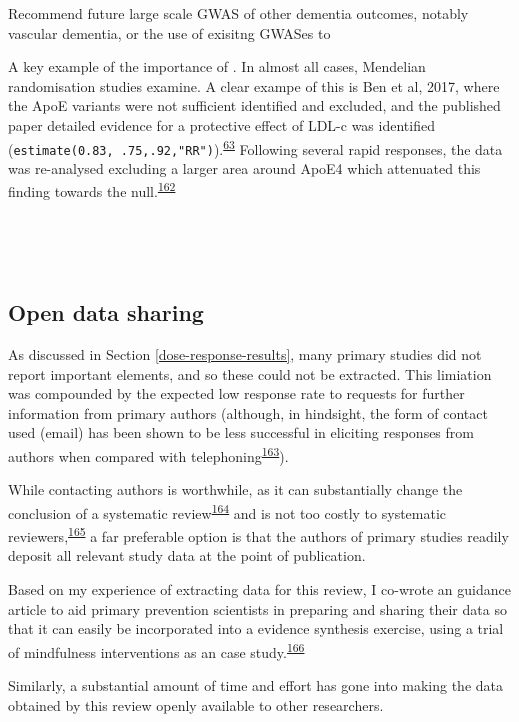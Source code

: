 \documentclass[a4paper, twoside]{templates/ociamthesis}
\begin{document}
Recommend future large scale GWAS of other dementia outcomes, notably vascular dementia, or the use of exisitng GWASes to

A key example of the importance of . In almost all cases, Mendelian randomisation studies examine. A clear exampe of this is Ben et al, 2017, where the ApoE variants were not sufficient identified and excluded, and the published paper detailed evidence for a protective effect of LDL-c was identified (\texttt{estimate(0.83,\ .75,.92,"RR")}).\textsuperscript{\protect\hyperlink{ref-benn2017}{63}} Following several rapid responses, the data was re-analysed excluding a larger area around ApoE4 which attenuated this finding towards the null.\textsuperscript{\protect\hyperlink{ref-benn2017a}{162}}

~

~

\hypertarget{sys-rev-open-data}{%
\subsection{Open data sharing}\label{sys-rev-open-data}}

As discussed in Section \ref{dose-response-results}, many primary studies did not report important elements, and so these could not be extracted. This limiation was compounded by the expected low response rate to requests for further information from primary authors (although, in hindsight, the form of contact used (email) has been shown to be less successful in eliciting responses from authors when compared with telephoning\textsuperscript{\protect\hyperlink{ref-danko2019}{163}}).

While contacting authors is worthwhile, as it can substantially change the conclusion of a systematic review\textsuperscript{\protect\hyperlink{ref-meursingereynders2019}{164}} and is not too costly to systematic reviewers,\textsuperscript{\protect\hyperlink{ref-cooper2019}{165}} a far preferable option is that the authors of primary studies readily deposit all relevant study data at the point of publication.

Based on my experience of extracting data for this review, I co-wrote an guidance article to aid primary prevention scientists in preparing and sharing their data so that it can easily be incorporated into a evidence synthesis exercise, using a trial of mindfulness interventions as an case study.\textsuperscript{\protect\hyperlink{ref-hennessy2021}{166}}

Similarly, a substantial amount of time and effort has gone into making the data obtained by this review openly available to other researchers.
\end{document}
